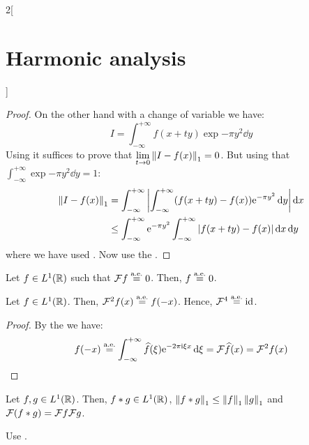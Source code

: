 \documentclass[../../../main_math.tex]{subfiles}
\begin{document}
\begin{multicols}{2}[\section{Harmonic analysis}]
\begin{proof}
    On the other hand with a change of variable we have: $$I=\int_{-\infty}^{+\infty}f(x+ty)\exp{-\pi y^2}\dd{y}$$ Using  it suffices to prove that $\displaystyle\lim_{t\to 0}\left\|I-f(x)\right\|_1=0$. But using that $\int_{-\infty}^{+\infty}\exp{-\pi y^2}\dd{y}=1$:
    \begin{align*}
      \left\|I-f(x)\right\|_1 & =\int_{-\infty}^{+\infty}\abs{\int_{-\infty}^{+\infty}(f(x+ty)-f(x))\mathrm{e}^{-\pi y^2}\dd{y}}\dd{x}  \\
                      & \leq\int_{-\infty}^{+\infty}\mathrm{e}^{-\pi y^2}\int_{-\infty}^{+\infty}\abs{f(x+ty)-f(x)}\dd{x}\dd{y}
    \end{align*}
    where we have used . Now use the .
  \end{proof}
  \begin{corollary}
    Let $f\in L^1(\mathbb{R})$ such that $\mathcal{F} f\overset{\text{a.e.}}{=}0$. Then, $f\overset{\text{a.e.}}{=}0$.
  \end{corollary}
  \begin{lemma}\label{HA:periodicity}
    Let $f\in L^1(\mathbb{R})$. Then, $\mathcal{F}^2f(x)\overset{\text{a.e.}}{=}f(-x)$. Hence, $\mathcal{F}^4\overset{\text{a.e.}}{=}\mathrm{id}$.
  \end{lemma}
  \begin{proof}
    By the  we have:
    $$f(-x)\overset{\text{a.e.}}{=}\int_{-\infty}^{+\infty}\widehat{f}(\xi)\mathrm{e}^{-2\pi\mathrm{i}\xi x}\dd{\xi}=\mathcal{F}\widehat{f}(x)=\mathcal{F}^2 f(x)$$
  \end{proof}
  \begin{lemma}
    Let $f,g\in L^1(\mathbb{R})$. Then, $f*g\in L^1(\mathbb{R})$, $\left\|f*g\right\|_1\leq\left\|f\right\|_1\left\|g\right\|_1$ and $\mathcal{F}(f*g)=\mathcal{F} f \mathcal{F} g$.
  \end{lemma}
  \begin{sproof}
    Use .
  \end{sproof}

\end{multicols}
\end{document}
